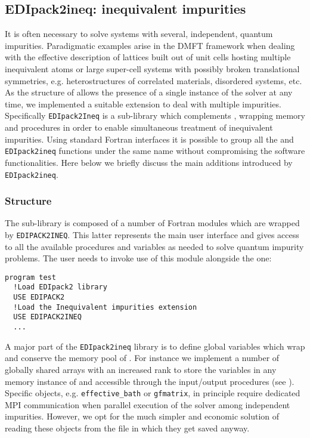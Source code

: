 \documentclass[edipack2.tex]{subfiles}
\begin{document}
\subsection{EDIpack2ineq: inequivalent impurities}\label{sSecIneq}
It is often necessary to solve systems with several, independent,
quantum impurities. Paradigmatic examples arise in the DMFT
framework when dealing with the effective description of lattices
built out of unit cells hosting multiple inequivalent atoms or large
super-cell systems with possibly broken translational symmetries,
e.g. heterostructures of correlated materials, disordered systems,
etc.
As the structure of \NAME allows the presence of a single instance of
the solver at any time, we implemented a suitable extension to deal
with multiple impurities. Specifically {\tt EDIpack2Ineq} is a
sub-library which complements \NAME, wrapping memory and procedures in
order to enable simultaneous treatment of  inequivalent impurities. 
Using standard Fortran interfaces it is possible to group all the
\NAME and {\tt EDIpack2ineq} functions under the same name without
compromising the software functionalities.  
Here below we briefly discuss the main additions introduced by {\tt
  EDIpack2ineq}. 

\subsubsection{Structure}\label{ssSecIneqStructure}
The sub-library is composed of a number of Fortran modules which are
wrapped by {\tt EDIPACK2INEQ}. This latter represents the main user
interface and gives access to all the available procedures and
variables as needed to solve quantum impurity problems.
The user needs to invoke use of this module alongside the \NAME one:
\begin{lstlisting}[style=fstyle,numbers=none,basicstyle={\scriptsize\ttfamily}]
program test
  !Load EDIpack2 library 
  USE EDIPACK2 
  !Load the Inequivalent impurities extension
  USE EDIPACK2INEQ
  ...
\end{lstlisting}


A major part of the {\tt EDIpack2ineq} library is to define global
variables which wrap and conserve the memory pool of \NAME.
For instance we implement a number of
globally shared arrays with an increased rank to store the
variables in any memory instance of \NAME and accessible through
the input/output procedures (see ).
Specific objects, e.g. {\tt effective\_bath} or {\tt gfmatrix}, in
principle require dedicated MPI
communication when parallel execution of the solver among independent
impurities. However, we opt for the much simpler and economic solution
of reading these objects from the file in which they get saved
anyway. 
\end{document}
